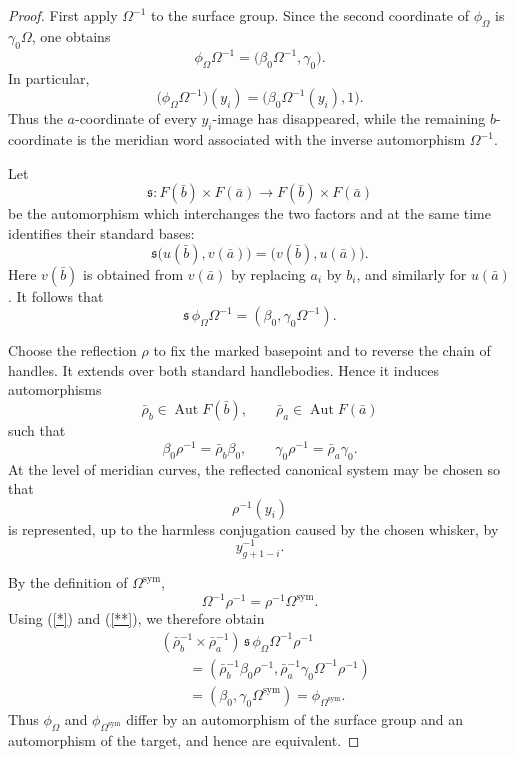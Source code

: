 \documentclass{article}
\DeclareMathOperator{\Aut}{Aut}
\begin{document}
\begin{proof}
First apply \(\Omega^{-1}\) to the surface group.  Since the second
coordinate of \(\phi_\Omega\) is \(\gamma_0\Omega\), one obtains
\[
   \phi_\Omega\Omega^{-1}
   =
   \bigl(\beta_0\Omega^{-1},\gamma_0\bigr).
\]
In particular,
\[
   \bigl(\phi_\Omega\Omega^{-1}\bigr)(y_i)
   =
   \bigl(\beta_0\Omega^{-1}(y_i),1\bigr).
\]
Thus the \(a\)-coordinate of every \(y_i\)-image has disappeared, while
the remaining \(b\)-coordinate is the meridian word associated with the
inverse automorphism \(\Omega^{-1}\).

Let
\[
   \mathfrak s:
   F(\bar b)\times F(\bar a)
   \longrightarrow
   F(\bar b)\times F(\bar a)
\]
be the automorphism which interchanges the two factors and at the same
time identifies their standard bases:
\[
   \mathfrak s\bigl(u(\bar b),v(\bar a)\bigr)
   =
   \bigl(v(\bar b),u(\bar a)\bigr).
\]
Here \(v(\bar b)\) is obtained from \(v(\bar a)\) by replacing
\(a_i\) by \(b_i\), and similarly for \(u(\bar a)\).  It follows that \begin{equation}\label{*}
 \mathfrak s\,\phi_\Omega\Omega^{-1}
   =
   (\beta_0,\gamma_0\Omega^{-1}).
\end{equation}

Choose the reflection \(\rho\) to fix the marked basepoint and to
reverse the chain of handles.  It extends over both standard
handlebodies.  Hence it induces automorphisms
\[
   \bar\rho_b\in\Aut F(\bar b),
   \qquad
   \bar\rho_a\in\Aut F(\bar a)
\]
such that
\begin{equation}\label{**}
   \beta_0\rho^{-1}=\bar\rho_b\beta_0,
   \qquad
   \gamma_0\rho^{-1}=\bar\rho_a\gamma_0.
\end{equation}
At the level of meridian curves, the reflected canonical system may be
chosen so that
\[
   \rho^{-1}(y_i)
\]
is represented, up to the harmless conjugation caused by the chosen
whisker, by
\[
   y_{g+1-i}^{-1}.
\]

By the definition of \(\Omega^{\mathrm{sym}}\),
\[
   \Omega^{-1}\rho^{-1}
   =
   \rho^{-1}\Omega^{\mathrm{sym}}.
\]
Using (\ref{*}) and (\ref{**}), we therefore obtain
\begin{equation}\label{***}
\begin{aligned}
 &(\bar\rho_b^{-1}\times\bar\rho_a^{-1})
   \,\mathfrak s\,\phi_\Omega\Omega^{-1}\rho^{-1}
\\
 &\qquad =
 (\bar\rho_b^{-1}\beta_0\rho^{-1},
  \bar\rho_a^{-1}\gamma_0\Omega^{-1}\rho^{-1})
\\
 &\qquad =
 (\beta_0,\gamma_0\Omega^{\mathrm{sym}})
 =
 \phi_{\Omega^{\mathrm{sym}}}.
\end{aligned}
\end{equation}
Thus \(\phi_\Omega\) and
\(\phi_{\Omega^{\mathrm{sym}}}\) differ by an automorphism of the
surface group and an automorphism of the target, and hence are
equivalent.


\end{proof}
\end{document}
